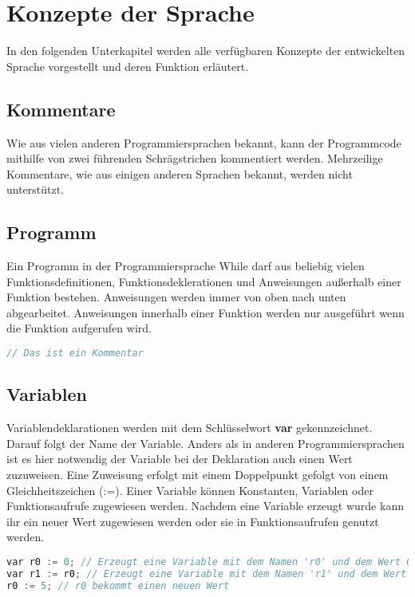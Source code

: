 \section{Konzepte der Sprache} \label{sec:while-konzepte}
In den folgenden Unterkapitel werden alle verfügbaren Konzepte der entwickelten Sprache vorgestellt und deren Funktion erläutert.

\subsection{Kommentare}
Wie aus vielen anderen Programmiersprachen bekannt, kann der Programmcode mithilfe von zwei führenden Schrägstrichen  kommentiert werden. Mehrzeilige Kommentare, wie aus einigen anderen Sprachen bekannt, werden nicht unterstützt.

\subsection{Programm}
Ein Programm in der Programmiersprache While darf aus beliebig vielen Funktionsdefinitionen, Funktionsdeklerationen und Anweisungen außerhalb einer Funktion bestehen. Anweisungen werden immer von oben nach unten abgearbeitet. Anweisungen innerhalb einer Funktion werden nur ausgeführt wenn die Funktion aufgerufen wird. 

\begin{lstlisting}[language=c, caption=Kommentare in While, label={lst:while-comment}]
	// Das ist ein Kommentar
\end{lstlisting}

\subsection{Variablen}
Variablendeklarationen werden mit dem Schlüsselwort \textbf{var} gekennzeichnet. Darauf folgt der Name der Variable. Anders als in anderen Programmiersprachen ist es hier notwendig der Variable bei der Deklaration auch einen Wert zuzuweisen. Eine Zuweisung erfolgt mit einem Doppelpunkt gefolgt von einem Gleichheitszeichen (:=). Einer Variable können Konstanten, Variablen oder Funktionsaufrufe zugewiesen werden. Nachdem eine Variable erzeugt wurde kann ihr ein neuer Wert zugewiesen werden oder sie in Funktionsaufrufen genutzt werden.

\begin{lstlisting}[language=c, caption=Variablennutzung in While, label={lst:while-var-defdec}]
var r0 := 0; // Erzeugt eine Variable mit dem Namen 'r0' und dem Wert 0
var r1 := r0; // Erzeugt eine Variable mit dem Namen 'r1' und dem Wert von r0
r0 := 5; // r0 bekommt einen neuen Wert
\end{lstlisting}

